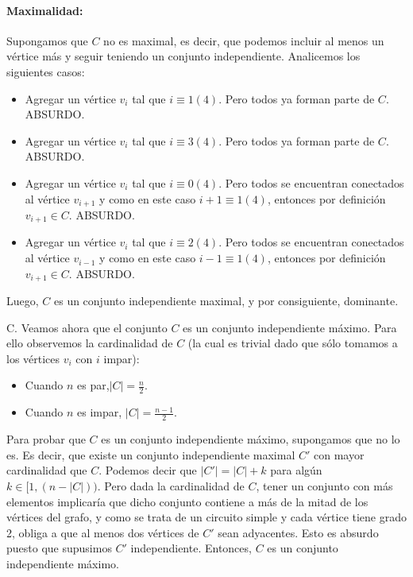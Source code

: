 \paragraph*{Maximalidad:} Supongamos que $C$ no es maximal, es decir, que podemos incluir al menos un vértice más y seguir teniendo un conjunto independiente. Analicemos los siguientes casos:

\begin{itemize}
	\item Agregar un vértice $v_i$ tal que $i \equiv 1 (4)$.  Pero todos ya forman parte de $C$. ABSURDO.
	\item Agregar un vértice $v_i$ tal que $i \equiv 3 (4)$.  Pero todos ya forman parte de $C$. ABSURDO.
	\item Agregar un vértice $v_i$ tal que $i \equiv 0 (4)$.  Pero todos se encuentran conectados al vértice $v_{i+1}$ y como en este caso $i+1 \equiv 1(4)$, entonces por definición $v_{i+1} \in C$. ABSURDO.
	\item Agregar un vértice $v_i$ tal que $i \equiv 2 (4)$.  Pero todos se encuentran conectados al vértice $v_{i-1}$ y como en este caso $i-1 \equiv 1(4)$, entonces por definición $v_{i+1} \in C$. ABSURDO.
\end{itemize}

Luego, $C$ es un conjunto independiente maximal, y por consiguiente, dominante. 

C. Veamos ahora que el conjunto $C$ es un conjunto independiente máximo.  Para ello observemos la cardinalidad de $C$ (la cual es trivial dado que sólo tomamos a los vértices $v_i$ con $i$ impar):

\begin{itemize}
	\item Cuando $n$ es par,$|C| = \frac{n}{2}$.
	\item Cuando $n$ es impar, $|C| = \frac{n-1}{2}$.	
\end{itemize}

Para probar que $C$ es un conjunto independiente máximo, supongamos que no lo es.  Es decir, que existe un conjunto independiente maximal $C'$ con mayor cardinalidad que $C$.  Podemos decir que $|C'| = |C| + k$ para algún $k \in [1, (n -|C|))$. Pero dada la cardinalidad de $C$, tener un conjunto con más elementos implicaría que dicho conjunto contiene a más de la mitad de los vértices del grafo, y como se trata de un circuito simple y cada vértice tiene grado 2, obliga a que al menos dos vértices de $C'$ sean adyacentes.  Esto es absurdo puesto que supusimos $C'$ independiente.  Entonces, $C$ es un conjunto independiente máximo.

